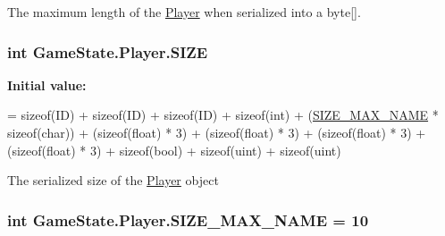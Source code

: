 The maximum length of the \hyperlink{class_game_state_1_1_player}{Player} when serialized into a byte\mbox{[}\mbox{]}. 

\hypertarget{class_game_state_1_1_player_ada2d068d3d5f973f73abac805c162d17}{
\subsubsection[{S\-I\-Z\-E}]{\setlength{\rightskip}{0pt plus 5cm}int Game\-State.\-Player.\-S\-I\-Z\-E\hspace{0.3cm}{\ttfamily [static]}}}\label{class_game_state_1_1_player_ada2d068d3d5f973f73abac805c162d17}
{\bfseries Initial value\-:}
\begin{DoxyCode}
=
            \textcolor{keyword}{sizeof}(ID) 
            + \textcolor{keyword}{sizeof}(ID) 
            + \textcolor{keyword}{sizeof}(ID) 
            + \textcolor{keyword}{sizeof}(\textcolor{keywordtype}{int}) + (\hyperlink{class_game_state_1_1_player_a1cdc9de8183b220e87632f7f6a7147d0}{SIZE\_MAX\_NAME} * \textcolor{keyword}{sizeof}(char))
            + (\textcolor{keyword}{sizeof}(float) * 3) 
            + (\textcolor{keyword}{sizeof}(float) * 3) 
            + (\textcolor{keyword}{sizeof}(float) * 3) 
            + (\textcolor{keyword}{sizeof}(float) * 3) 
            + \textcolor{keyword}{sizeof}(bool) 
            + \textcolor{keyword}{sizeof}(uint) 
            + \textcolor{keyword}{sizeof}(uint)
\end{DoxyCode}


The serialized size of the \hyperlink{class_game_state_1_1_player}{Player} object 

\hypertarget{class_game_state_1_1_player_a1cdc9de8183b220e87632f7f6a7147d0}{
\subsubsection[{S\-I\-Z\-E\-\_\-\-M\-A\-X\-\_\-\-N\-A\-M\-E}]{\setlength{\rightskip}{0pt plus 5cm}int Game\-State.\-Player.\-S\-I\-Z\-E\-\_\-\-M\-A\-X\-\_\-\-N\-A\-M\-E = 10\hspace{0.3cm}{\ttfamily [static]}}}\label{class_game_state_1_1_player_a1cdc9de8183b220e87632f7f6a7147d0}


